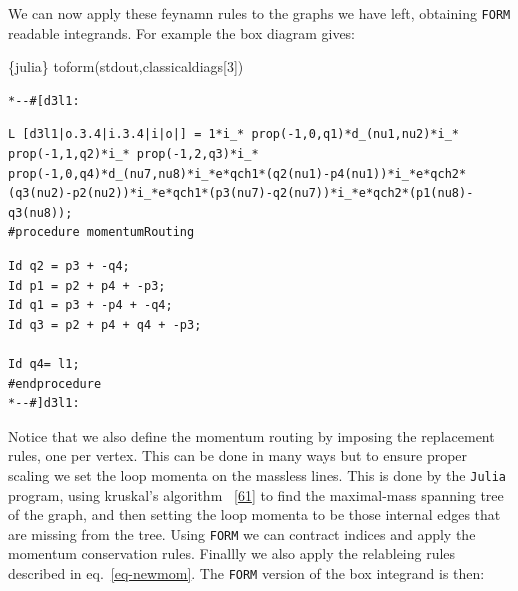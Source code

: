 \documentclass[
  10pt,
  a4paper,
  DIV=11,
  numbers=noendperiod,
  twoside]{scrreprt}
\newenvironment{Shaded}{\begin{snugshade}}{\end{snugshade}}
\newcommand{\DecValTok}[1]{\textcolor[rgb]{0.68,0.00,0.00}{#1}}
\newcommand{\InformationTok}[1]{\textcolor[rgb]{0.37,0.37,0.37}{#1}}
\newcommand{\NormalTok}[1]{\textcolor[rgb]{0.00,0.23,0.31}{#1}}
\DeclareRobustCommand{\[}{\begin{equation}}
\DeclareRobustCommand{\]}{\end{equation}}
\begin{document}
We can now apply these feynamn rules to the graphs we have left,
obtaining \texttt{FORM} readable integrands. For example the box diagram
gives:

\begin{Shaded}
\begin{Highlighting}[]
\InformationTok{\textasciigrave{}\textasciigrave{}\textasciigrave{}\{julia\}}
\NormalTok{toform(stdout,classicaldiags[}\DecValTok{3}\NormalTok{])}
\InformationTok{\textasciigrave{}\textasciigrave{}\textasciigrave{}}
\end{Highlighting}
\end{Shaded}

\begin{verbatim}
*--#[d3l1:
\end{verbatim}

\begin{verbatim}
L [d3l1|o.3.4|i.3.4|i|o|] = 1*i_* prop(-1,0,q1)*d_(nu1,nu2)*i_* prop(-1,1,q2)*i_* prop(-1,2,q3)*i_* prop(-1,0,q4)*d_(nu7,nu8)*i_*e*qch1*(q2(nu1)-p4(nu1))*i_*e*qch2*(q3(nu2)-p2(nu2))*i_*e*qch1*(p3(nu7)-q2(nu7))*i_*e*qch2*(p1(nu8)-q3(nu8));
#procedure momentumRouting
\end{verbatim}

\begin{verbatim}
Id q2 = p3 + -q4;
Id p1 = p2 + p4 + -p3;
Id q1 = p3 + -p4 + -q4;
Id q3 = p2 + p4 + q4 + -p3;

Id q4= l1;
#endprocedure
*--#]d3l1:
\end{verbatim}

Notice that we also define the momentum routing by imposing the
replacement rules, one per vertex. This can be done in many ways but to
ensure proper scaling we set the loop momenta on the massless lines.
This is done by the \texttt{Julia} program, using kruskal's algorithm
~{[}\protect\hyperlink{ref-Kruskal:1956}{61}{]} to find the maximal-mass
spanning tree of the graph, and then setting the loop momenta to be
those internal edges that are missing from the tree. Using \texttt{FORM}
we can contract indices and apply the momentum conservation rules.
Finallly we also apply the relableing rules described in
eq.~\ref{eq-newmom}. The \texttt{FORM} version of the box integrand is
then:
\end{document}
